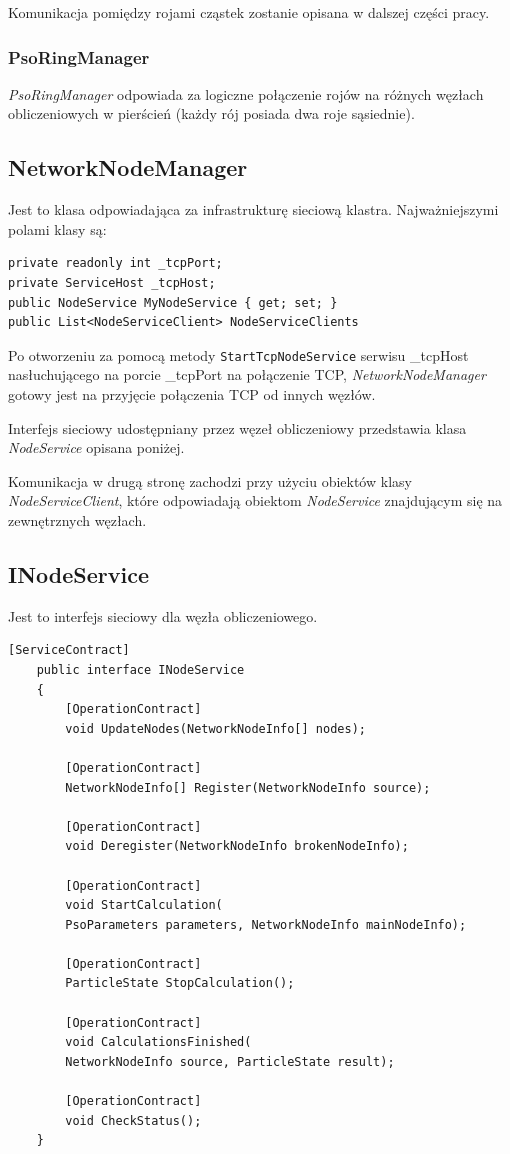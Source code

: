 \documentclass[12pt, twoside, openany, abstract=on]{report}
\theoremstyle{definition}
\begin{document}
Komunikacja pomiędzy rojami cząstek zostanie opisana w dalszej części pracy.

\subsubsection{PsoRingManager}
\textit{PsoRingManager} odpowiada za logiczne połączenie rojów na różnych węzłach obliczeniowych w pierścień (każdy rój posiada dwa roje sąsiednie).


\subsection{NetworkNodeManager}
Jest to klasa odpowiadająca za infrastrukturę sieciową klastra. Najważniejszymi polami klasy są:

\begin{lstlisting}[frame=single]
private readonly int _tcpPort;
private ServiceHost _tcpHost;
public NodeService MyNodeService { get; set; }
public List<NodeServiceClient> NodeServiceClients
\end{lstlisting}

Po otworzeniu za pomocą metody \texttt{StartTcpNodeService} serwisu \_tcpHost nasłuchującego na porcie \_tcpPort na połączenie TCP, \textit{NetworkNodeManager} gotowy jest na przyjęcie połączenia TCP od innych węzłów. 

Interfejs sieciowy udostępniany przez węzeł obliczeniowy przedstawia klasa \textit{NodeService} opisana poniżej.

Komunikacja w drugą stronę zachodzi przy użyciu obiektów klasy \textit{NodeServiceClient}, które odpowiadają obiektom \textit{NodeService} znajdującym się na zewnętrznych węzłach.

\subsection{INodeService}
Jest to interfejs sieciowy dla węzła obliczeniowego.

\begin{lstlisting}[frame=single]
 [ServiceContract]
    public interface INodeService
    {
        [OperationContract] 
        void UpdateNodes(NetworkNodeInfo[] nodes);

        [OperationContract]
        NetworkNodeInfo[] Register(NetworkNodeInfo source);

        [OperationContract]
        void Deregister(NetworkNodeInfo brokenNodeInfo);

        [OperationContract]
        void StartCalculation(
        PsoParameters parameters, NetworkNodeInfo mainNodeInfo);

        [OperationContract]
        ParticleState StopCalculation();

        [OperationContract]
        void CalculationsFinished(
        NetworkNodeInfo source, ParticleState result);

        [OperationContract]
        void CheckStatus();
    }
\end{lstlisting}
\end{document}
